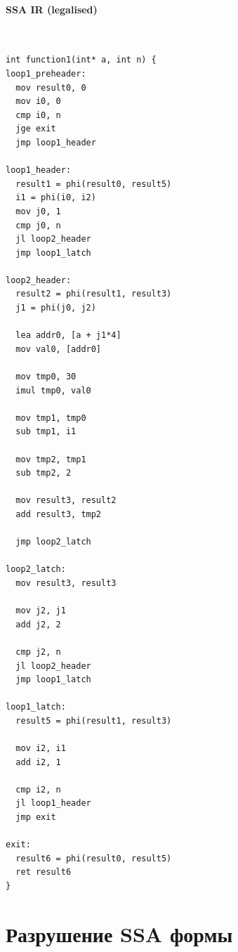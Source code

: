 \paragraph{SSA IR (legalised)} ~\\
\begin{lstlisting}
int function1(int* a, int n) {
loop1_preheader:
  mov result0, 0
  mov i0, 0
  cmp i0, n
  jge exit
  jmp loop1_header

loop1_header:
  result1 = phi(result0, result5)
  i1 = phi(i0, i2)
  mov j0, 1
  cmp j0, n
  jl loop2_header
  jmp loop1_latch

loop2_header:
  result2 = phi(result1, result3)
  j1 = phi(j0, j2)
  
  lea addr0, [a + j1*4]
  mov val0, [addr0]
  
  mov tmp0, 30
  imul tmp0, val0
  
  mov tmp1, tmp0
  sub tmp1, i1
  
  mov tmp2, tmp1
  sub tmp2, 2
  
  mov result3, result2
  add result3, tmp2
  
  jmp loop2_latch

loop2_latch:
  mov result3, result3
  
  mov j2, j1
  add j2, 2
  
  cmp j2, n
  jl loop2_header
  jmp loop1_latch

loop1_latch:
  result5 = phi(result1, result3)
  
  mov i2, i1
  add i2, 1
  
  cmp i2, n
  jl loop1_header
  jmp exit

exit:
  result6 = phi(result0, result5)
  ret result6
}
\end{lstlisting}

\section{Разрушение SSA формы}


